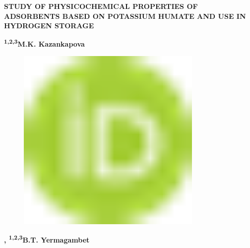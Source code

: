 
{\bfseries STUDY OF PHYSICOCHEMICAL PROPERTIES OF ADSORBENTS BASED ON
POTASSIUM HUMATE AND USE IN HYDROGEN STORAGE}

{\bfseries \textsuperscript{1,2,3}M.K. Kazankapova}

\begin{figure}[H]
	\centering
	\includegraphics[width=0.8\textwidth]{media/chem2/image1}
	\caption*{}
\end{figure}
{\bfseries \textsuperscript{\envelope },
\textsuperscript{1,2,3}B.T. Yermagambet}


